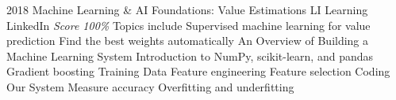\documentclass[11pt,a4paper]{moderncv}
\begin{document}
\cventry
    {2018}
    {Machine Learning \& AI Foundations: Value Estimations}
    {LI Learning}
    {LinkedIn}
    {\textit{Score 100\%}}
    {
        Topics include                                                                                            %
            Supervised machine learning for value prediction                                                      %
            Find the best weights automatically                                                                   %
            An Overview of Building a Machine Learning System                                                     %
            Introduction to NumPy, scikit-learn, and pandas                                                       %
            Gradient boosting                                                                                     %
            Training Data                                                                                         %
            Feature engineering                                                                                   %
            Feature selection                                                                                     %
            Coding Our System                                                                                     %
            Measure accuracy                                                                                      %
            Overfitting and underfitting                                                                          %
    }
\end{document}
